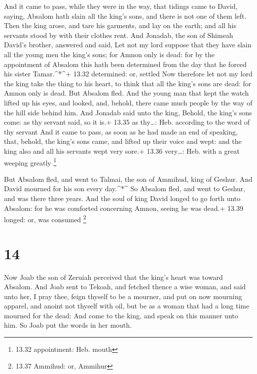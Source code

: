 And it came to pass, while they were in the way, that
tidings came to David, saying, Absalom hath slain all the king's sons,
and there is not one of them left.  Then the king arose,
and tare his garments, and lay on the earth; and all his servants stood
by with their clothes rent.  And Jonadab, the son of
Shimeah David's brother, answered and said, Let not my lord suppose that
they have slain all the young men the king's sons; for Amnon only is
dead: for by the appointment of Absalom this hath been determined from
the day that he forced his sister Tamar.\^{}*\^{}+ 13.32 determined: or,
settled  Now therefore let not my lord the king take the
thing to his heart, to think that all the king's sons are dead: for
Amnon only is dead.  But Absalom fled. And the young man
that kept the watch lifted up his eyes, and looked, and, behold, there
came much people by the way of the hill side behind him. 
And Jonadab said unto the king, Behold, the king's sons come: as thy
servant said, so it is.+ 13.35 as thy\ldots: Heb. according to the word
of thy servant  And it came to pass, as soon as he had made
an end of speaking, that, behold, the king's sons came, and lifted up
their voice and wept: and the king also and all his servants wept very
sore.+ 13.36 very\ldots: Heb. with a great weeping greatly \footnote{13.32
  appointment: Heb. mouth}

 But Absalom fled, and went to Talmai, the son of Ammihud,
king of Geshur. And David mourned for his son every day.\^{}*\^{}
 So Absalom fled, and went to Geshur, and was there three
years.  And the soul of king David longed to go forth unto
Absalom: for he was comforted concerning Amnon, seeing he was dead.+
13.39 longed: or, was consumed \footnote{13.37 Ammihud: or, Ammihur}

\hypertarget{section-13}{%
\section{14}\label{section-13}}

 Now Joab the son of Zeruiah perceived that the king's heart
was toward Absalom.  And Joab sent to Tekoah, and fetched
thence a wise woman, and said unto her, I pray thee, feign thyself to be
a mourner, and put on now mourning apparel, and anoint not thyself with
oil, but be as a woman that had a long time mourned for the dead:
 And come to the king, and speak on this manner unto him. So
Joab put the words in her mouth.

